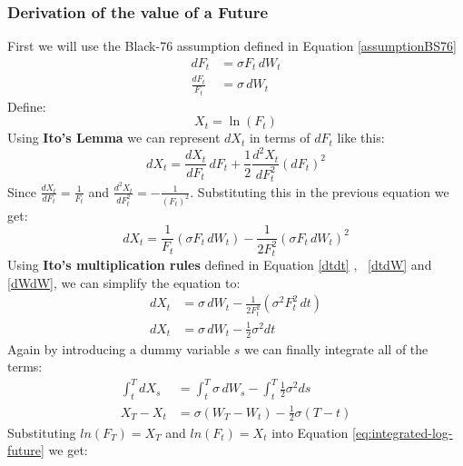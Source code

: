 \documentclass[12pt]{article}
\numberwithin{equation}{section}
\begin{document}
\subsubsection{Derivation of the value of a Future}
First we will use the Black-76 assumption defined in Equation \ref{assumptionBS76}
\begin{equation*} 
	\begin{aligned}
		dF_t &=  \sigma F_t\,dW_t \\
		\frac{dF_t}{F_t} &= \sigma\,dW_t
	\end{aligned}
	\label{eq:b76-sde}
\end{equation*}
Define: 
\begin{equation}
	X_t = \ln(F_t)
	\label{eq:log-future-definition}
\end{equation}
Using \textbf{Ito's Lemma} we can represent $dX_t$ in terms of $dF_t$ like this: 
\begin{equation*}
	dX_t = \frac{d X_t}{d F_t}\,dF_t + \frac{1}{2}\frac{d^2 X_t}{d F_t^2}(dF_t)^2 
\end{equation*}
Since $\frac{d X_t}{d F_t} = \frac{1}{F_t}$ and $\frac{d^2 X_t}{d F_t^2} = -\frac{1}{(F_t)^2}$. Substituting this in the previous equation we get:
\begin{equation}
		dX_t = \frac{1}{F_t}\left(\sigma F_t\,dW_t\right)
		-\frac{1}{2F_t^2}
		\left(\sigma F_t\,dW_t\right)^2 
\end{equation}
Using \textbf{Ito's multiplication rules} defined in Equation \ref{dtdt} , \ \ref{dtdW} and \ref{dWdW}, we can simplify the equation to: 
\begin{equation}
	\begin{aligned}
		dX_t &= \sigma\,dW_t
		-\frac{1}{2F_t^2}
		\left(\sigma^2F_t^2\,dt\right) \\
		dX_t &=\sigma\,dW_t  -\frac{1}{2}\sigma^2 dt
	\end{aligned}
	\label{eq:ito-log-stock}
\end{equation}
Again by introducing a dummy variable $s$ we can finally integrate all of the terms:
\begin{equation}
	\begin{aligned}
		\int_t^T dX_s
		&=
		\int_t^T \sigma\,dW_s - \int_t^T \frac{1}{2}\sigma^2 ds
		 \\
		X_T-X_t
		&=
		\sigma(W_T - W_t) - \frac{1}{2}\sigma(T-t)
	\end{aligned}
	\label{eq:integrated-log-future}
\end{equation}
Substituting $ln(F_T) = X_T$ and $ln(F_t) = X_t$ into Equation \ref{eq:integrated-log-future} we get:
\end{document}
